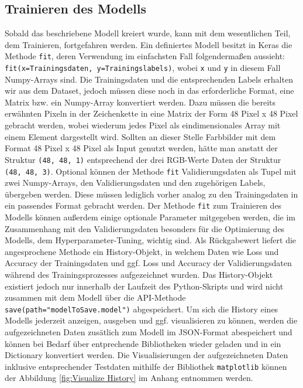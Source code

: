 \documentclass[12pt, a4paper]{report}
\begin{document}
\subsection{Trainieren des Modells}
Sobald das beschriebene Modell kreiert wurde, kann mit dem wesentlichen Teil, dem Trainieren, fortgefahren werden. Ein definiertes Modell besitzt in Keras die Methode \texttt{fit}, deren Verwendung im einfachsten Fall folgendermaßen aussieht: \texttt{fit(x=Trainingsdaten, y=Trainingslabels)}, wobei \texttt{x} und \texttt{y} in diesem Fall Numpy-Arrays sind. Die Trainingsdaten und die entsprechenden Labels erhalten wir aus dem Dataset, jedoch müssen diese noch in das erforderliche Format, eine Matrix bzw. ein Numpy-Array konvertiert werden. Dazu müssen die bereits erwähnten Pixeln in der Zeichenkette in eine Matrix der Form 48 Pixel x 48 Pixel gebracht werden, wobei wiederum jedes Pixel als eindimensionales Array mit einem Element dargestellt wird. Sollten an dieser Stelle Farbbilder mit dem Format 48 Pixel x 48 Pixel als Input genutzt werden, hätte man anstatt der Struktur \texttt{(48, 48, 1)} entsprechend der drei RGB-Werte Daten der Struktur \texttt{(48, 48, 3)}. Optional können der Methode \texttt{fit} Validierungsdaten als Tupel mit zwei Numpy-Arrays, den Validierungsdaten und den zugehörigen Labels, übergeben werden. Diese müssen lediglich vorher analog zu den Trainingsdaten in ein passendes Format gebracht werden. Der Methode \texttt{fit} zum Trainieren des Modells können außerdem einige optionale Parameter mitgegeben werden, die im Zusammenhang mit den Validierungsdaten besonders für die Optimierung des Modells, dem Hyperparameter-Tuning, wichtig sind.\newline
Als Rückgabewert liefert die angesprochene Methode ein History-Objekt, in welchem Daten wie Loss und Accuracy der Trainingsdaten und ggf. Loss und Accuracy der Validierungsdaten während des Trainingsprozesses aufgezeichnet wurden. Das History-Objekt existiert jedoch nur innerhalb der Laufzeit des Python-Skripts und wird nicht zusammen mit dem Modell über die API-Methode \texttt{save(path="modelToSave.model")} abgespeichert. Um sich die History eines Modells jederzeit anzeigen, ausgeben und ggf. visualisieren zu können, werden die aufgezeichneten Daten zusätlich zum Modell im JSON-Format abespeichert und können bei Bedarf über entprechende Bibliotheken wieder geladen und in ein Dictionary konvertiert werden.\newline
Die Visualisierungen der aufgezeichneten Daten inklusive entsprechender Testdaten mithilfe der Bibliothek \texttt{matplotlib} können der Abbildung \ref{fig:Visualize History} im Anhang entnommen werden.
\end{document}
